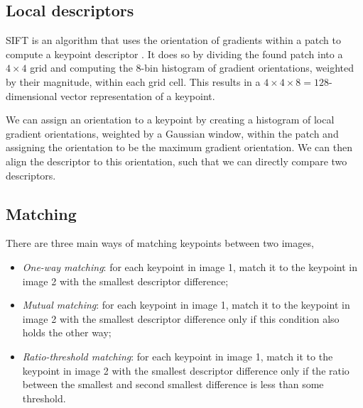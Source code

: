 \subsection{Local descriptors}

SIFT is an algorithm that uses the orientation of gradients within a patch to
compute a keypoint descriptor \citep{lowe2004distinctive}. It does so by
dividing the found patch into a $4\times 4$ grid and computing the 8-bin
histogram of gradient orientations, weighted by their magnitude, within each
grid cell. This results in a $4\times 4\times 8=128$-dimensional vector
representation of a keypoint.

We can assign an orientation to a keypoint by creating a histogram of local
gradient orientations, weighted by a Gaussian window, within the patch and
assigning the orientation to be the maximum gradient orientation. We can then
align the descriptor to this orientation, such that we can directly compare two
descriptors.

\subsection{Matching}

There are three main ways of matching keypoints between two images,
\begin{itemize}
    \item \textit{One-way matching}: for each keypoint in image 1, match it to the
          keypoint in image 2 with the smallest descriptor difference;
    \item \textit{Mutual matching}: for each keypoint in image 1, match it to the
          keypoint in image 2 with the smallest descriptor difference only if this condition
          also holds the other way;
    \item \textit{Ratio-threshold matching}: for each keypoint in image 1, match
          it to the keypoint in image 2 with the smallest descriptor difference only
          if the ratio between the smallest and second smallest difference is less
          than some threshold.
\end{itemize}

